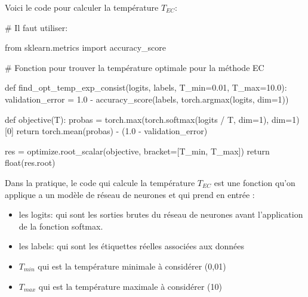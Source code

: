 \documentclass[
  letterpaper,
  DIV=11,
  numbers=noendperiod]{scrartcl}
\newenvironment{Shaded}{\begin{snugshade}}{\end{snugshade}}
\newcommand{\BuiltInTok}[1]{\textcolor[rgb]{0.00,0.23,0.31}{#1}}
\newcommand{\CommentTok}[1]{\textcolor[rgb]{0.37,0.37,0.37}{#1}}
\newcommand{\ControlFlowTok}[1]{\textcolor[rgb]{0.00,0.23,0.31}{#1}}
\newcommand{\DecValTok}[1]{\textcolor[rgb]{0.68,0.00,0.00}{#1}}
\newcommand{\FloatTok}[1]{\textcolor[rgb]{0.68,0.00,0.00}{#1}}
\newcommand{\ImportTok}[1]{\textcolor[rgb]{0.00,0.46,0.62}{#1}}
\newcommand{\KeywordTok}[1]{\textcolor[rgb]{0.00,0.23,0.31}{#1}}
\newcommand{\NormalTok}[1]{\textcolor[rgb]{0.00,0.23,0.31}{#1}}
\newcommand{\OperatorTok}[1]{\textcolor[rgb]{0.37,0.37,0.37}{#1}}
\begin{document}
Voici le code pour calculer la température \(T_{EC}\):

\begin{Shaded}
\begin{Highlighting}[]
\CommentTok{\# Il faut utiliser:}

\ImportTok{from}\NormalTok{ sklearn.metrics }\ImportTok{import}\NormalTok{ accuracy\_score}

\CommentTok{\# Fonction pour trouver la température optimale pour la méthode EC}

\KeywordTok{def}\NormalTok{ find\_opt\_temp\_exp\_consist(logits, labels, T\_min}\OperatorTok{=}\FloatTok{0.01}\NormalTok{, T\_max}\OperatorTok{=}\FloatTok{10.0}\NormalTok{):}
\NormalTok{    validation\_error }\OperatorTok{=} \FloatTok{1.0} \OperatorTok{{-}}\NormalTok{ accuracy\_score(labels, torch.argmax(logits, dim}\OperatorTok{=}\DecValTok{1}\NormalTok{))}

    \KeywordTok{def}\NormalTok{ objective(T):}
\NormalTok{        probas }\OperatorTok{=}\NormalTok{ torch.}\BuiltInTok{max}\NormalTok{(torch.softmax(logits }\OperatorTok{/}\NormalTok{ T, dim}\OperatorTok{=}\DecValTok{1}\NormalTok{), dim}\OperatorTok{=}\DecValTok{1}\NormalTok{)[}\DecValTok{0}\NormalTok{]}
        \ControlFlowTok{return}\NormalTok{ torch.mean(probas) }\OperatorTok{{-}}\NormalTok{ (}\FloatTok{1.0} \OperatorTok{{-}}\NormalTok{ validation\_error)}

\NormalTok{    res }\OperatorTok{=}\NormalTok{ optimize.root\_scalar(objective, bracket}\OperatorTok{=}\NormalTok{[T\_min, T\_max])}
    \ControlFlowTok{return} \BuiltInTok{float}\NormalTok{(res.root)}
\end{Highlighting}
\end{Shaded}

Dans la pratique, le code qui calcule la température \(T_{EC}\) est une
fonction qu'on applique a un modèle de réseau de neurones et qui prend
en entrée :

\begin{itemize}
\item
  les logits: qui sont les sorties brutes du réseau de neurones avant
  l'application de la fonction softmax.
\item
  les labels: qui sont les étiquettes réelles associées aux données
\item
  \(T_{min}\) qui est la température minimale à considérer (0,01)
\item
  \(T_{max}\) qui est la température maximale à considérer (10)
\end{itemize}
\end{document}
